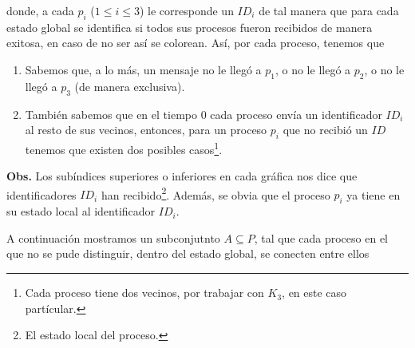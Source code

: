 donde, a cada $p_i$ ($1 \leq i \leq 3$) le corresponde un $ID_i$ de
tal manera que para cada estado global se identifica si todos sus
procesos fueron recibidos de manera exitosa, en caso de no ser así
se colorean.
Así, por cada proceso, tenemos que
\begin{enumerate}
\item Sabemos que, a lo más, un mensaje no le llegó a $p_1$,
o no le llegó a $p_2$, o no le llegó a $p_3$ (de manera exclusiva).
\item También sabemos que en el tiempo $0$ cada proceso envía
un identificador $ID_i$ al resto de sus vecinos, entonces,
para un proceso $p_i$ que no recibió un $ID$ tenemos que existen
dos posibles casos\footnote{Cada proceso tiene dos vecinos, por trabajar
con $K_3$, en este caso partícular.}.
\end{enumerate}

\textbf{Obs.} Los subíndices superiores o inferiores en cada gráfica
nos dice que identificadores $ID_i$ han recibido\footnote{El estado local
del proceso.}. Además, se obvia que el proceso $p_i$ ya tiene en su
estado local al identificador $ID_i$.
\newline

A continuación mostramos un subconjutnto  $A \subseteq P$, tal que cada proceso
en el que no se pude distinguir, dentro del estado global, se conecten entre
ellos

